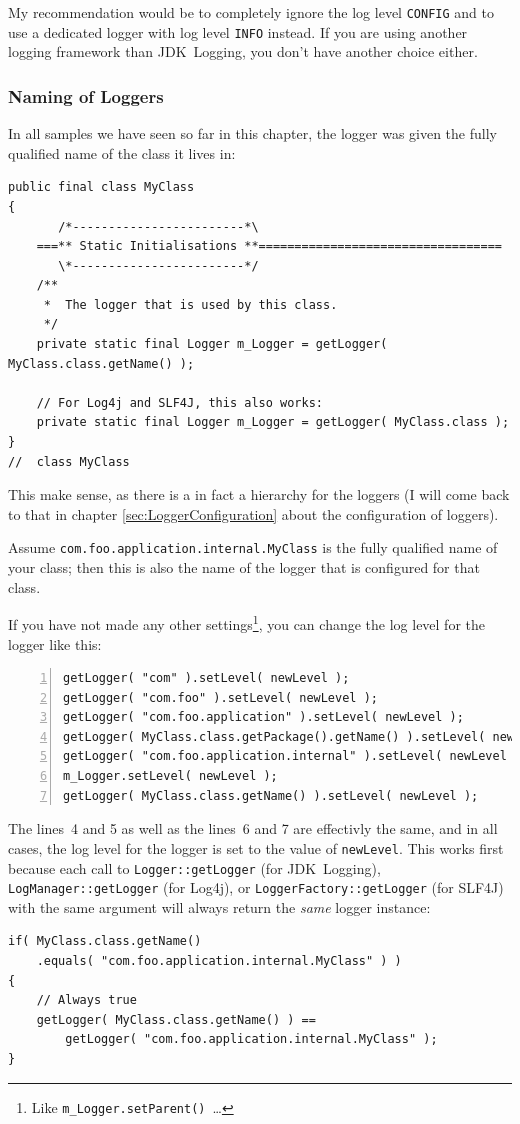 \documentclass[11pt,a4paper, titlepage, parskip=half, headsepline, footsepline, cleardoublepage=current, headheight=1cm]{scrbook}
\begin{document}
My recommendation would be to completely ignore the log level \verb#CONFIG# and to use a dedicated logger with log level \verb#INFO# instead. If you are using another logging framework than JDK~Logging, you don't have another choice either.

\subsubsection{Naming of Loggers}\label{sec:NamingOfLoggers}
In all samples we have seen so far in this chapter, the logger was given the fully qualified name of the class it lives in:
\begin{lstlisting}
public final class MyClass
{
       /*------------------------*\
    ===** Static Initialisations **==================================
       \*------------------------*/
    /**
     *  The logger that is used by this class.
     */
    private static final Logger m_Logger = getLogger( MyClass.class.getName() );
    
    // For Log4j and SLF4J, this also works:
    private static final Logger m_Logger = getLogger( MyClass.class );
}
//  class MyClass
\end{lstlisting}
This make sense, as there is a in fact a hierarchy for the loggers (I will come back to that in chapter \ref{sec:LoggerConfiguration} about the configuration of loggers).

Assume \lstinline|com.foo.application.internal.MyClass| is the fully qualified name of your class; then this is also the name of the logger that is configured for that class.

If you have not made any other settings\footnote{Like \lstinline|m_Logger.setParent()|~…}, you can change the log level for the logger like this:
\begin{lstlisting}[numbers=left]
getLogger( "com" ).setLevel( newLevel );
getLogger( "com.foo" ).setLevel( newLevel );
getLogger( "com.foo.application" ).setLevel( newLevel );
getLogger( MyClass.class.getPackage().getName() ).setLevel( newLevel );
getLogger( "com.foo.application.internal" ).setLevel( newLevel );
m_Logger.setLevel( newLevel );
getLogger( MyClass.class.getName() ).setLevel( newLevel );
\end{lstlisting}

The lines~4 and 5 as well as the lines~6 and 7 are effectivly the same, and in all cases, the log level for the logger is set to the value of \lstinline|newLevel|. This works first because each call to \lstinline|Logger::getLogger| (for JDK~Logging), \lstinline|LogManager::getLogger| (for Log4j), or \lstinline|LoggerFactory::getLogger| (for SLF4J) with the same argument will always return the \textit{same} logger instance:
\begin{lstlisting}
if( MyClass.class.getName()
    .equals( "com.foo.application.internal.MyClass" ) )
{
    // Always true
    getLogger( MyClass.class.getName() ) == 
        getLogger( "com.foo.application.internal.MyClass" );
}
\end{lstlisting}
\end{document}
